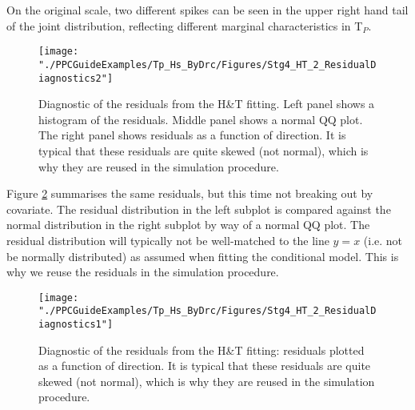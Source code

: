 On the original scale, two different spikes can be seen in the upper right hand tail of the joint distribution, reflecting different marginal characteristics in T$_P$.  

\vspace{10pt}
		\noindent{}
\vspace{10pt}

\begin{figure}
	\centering
	\texttt{[image: "./PPCGuideExamples/Tp\_Hs\_ByDrc/Figures/Stg4\_HT\_2\_ResidualDiagnostics2"]}
	\caption{Diagnostic of the residuals from the H\&T fitting. Left panel shows a histogram of the residuals. Middle panel shows a normal QQ plot.  The right panel shows residuals as a function of direction. It is typical that these residuals are quite skewed (not normal), which is why they are reused in the simulation procedure.}
	\label{fig:Stg4_HT_2_ResidualDiagnostics2}
\end{figure}

Figure \ref{fig:Stg4_HT_2_ResidualDiagnostics1} summarises the same residuals, but this time not breaking out by covariate. The residual distribution in the left subplot is compared against the normal distribution in the right subplot by way of a normal QQ plot. The residual distribution will typically not be well-matched to the line $y=x$ (i.e. not be normally distributed) as assumed when fitting the conditional model. This is why we reuse the residuals in the simulation procedure. 

\begin{figure}
	\centering
	\texttt{[image: "./PPCGuideExamples/Tp\_Hs\_ByDrc/Figures/Stg4\_HT\_2\_ResidualDiagnostics1"]}
	\caption{Diagnostic of the residuals from the H\&T fitting: residuals plotted as a function of direction. It is typical that these residuals are quite skewed (not normal), which is why they are reused in the simulation procedure.}
	\label{fig:Stg4_HT_2_ResidualDiagnostics1}
\end{figure}



